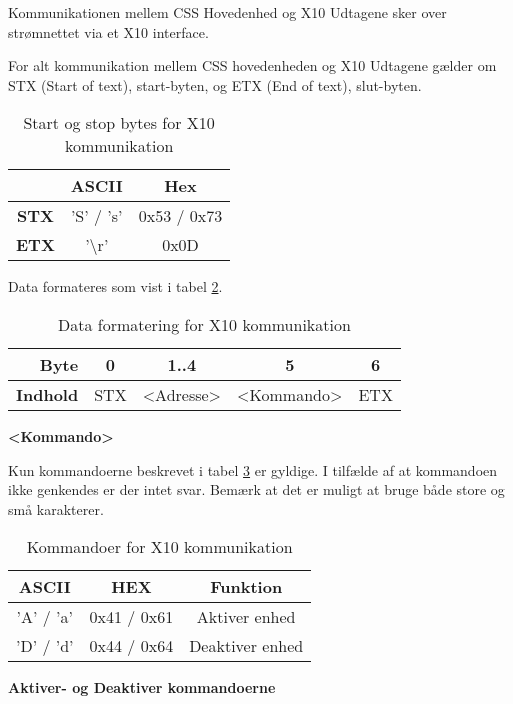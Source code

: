 Kommunikationen mellem CSS Hovedenhed og X10 Udtagene sker over strømnettet via et X10 interface.

For alt kommunikation mellem CSS hovedenheden og X10 Udtagene gælder om STX (Start of text), start-byten, og ETX (End of text), slut-byten.

\begin{table}[h]
	\caption{Start og stop bytes for X10 kommunikation}
	\centering
	\begin{tabular}{|c|c|c|}
		\hline 
		& ASCII & Hex \\ 
		\hline 
		\textbf{STX} & 'S' / 's' & 0x53 / 0x73 \\ 
		\hline 
		\textbf{ETX} & '\textbackslash r' & 0x0D \\ 
		\hline 
	\end{tabular} 
	\label{table:X10StartStopBytes}
\end{table}

Data formateres som vist i tabel \ref{table:X10DataFormat}.

\begin{table}[h]
	\caption{Data formatering for X10 kommunikation}
	\centering
	\begin{tabular}{|r|c|c|c|c|}
		\hline 
		\textbf{Byte} & 0 & 1..4 & 5 & 6 \\ 
		\hline 
		\textbf{Indhold} & STX & <Adresse> & <Kommando> & ETX \\ 
		\hline 
	\end{tabular} 
	\label{table:X10DataFormat}
\end{table}

\textbf{<Kommando>}

Kun kommandoerne beskrevet i tabel \ref{tabel:X10Kommandoer} er gyldige. I tilfælde af at kommandoen ikke genkendes er der intet svar. Bemærk at det er muligt at bruge både store og små karakterer.

\begin{table}[h]
\caption{Kommandoer for X10 kommunikation}
\centering
\begin{tabular}{|c|c|c|}
\hline 
\textbf{ASCII} & \textbf{HEX} & \textbf{Funktion} \\ 
\hline 
'A' / 'a' & 0x41 / 0x61 & Aktiver enhed \\ 
\hline 
'D' / 'd' & 0x44 / 0x64 & Deaktiver enhed \\ 
\hline
\end{tabular}
\label{tabel:X10Kommandoer}
\end{table} 

\textbf{Aktiver- og Deaktiver kommandoerne}

